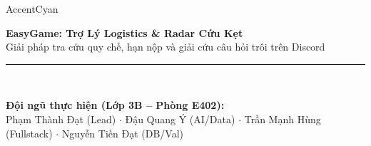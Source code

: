 \documentclass[aspectratio=169,10pt]{beamer}
\begin{document}
\begin{frame}[plain]
  \vfill
  \centering
  \begin{glassbox}[width=0.92\textwidth]{AccentCyan}
    \centering
    \vspace{0.3cm}
    \vspace{0.4cm}
    
    {\Huge \textbf{\color{TextLight}EasyGame: Trợ Lý Logistics \& Radar Cứu Kẹt}}\\[0.2cm]
    {\large \color{AccentCyan} Giải pháp tra cứu quy chế, hạn nộp và giải cứu câu hỏi trôi trên Discord}\\[0.4cm]
    
    \textcolor{BorderCol}{\rule{0.8\textwidth}{0.5pt}}\\[0.3cm]
    
    \begin{minipage}[t]{0.85\textwidth}
      \centering\small\color{TextMuted}
      \textbf{Đội ngũ thực hiện (Lớp 3B -- Phòng E402):}\\[0.1cm]
      Phạm Thành Đạt (Lead) $\cdot$ Đậu Quang Ý (AI/Data) $\cdot$ Trần Mạnh Hùng (Fullstack) $\cdot$ Nguyễn Tiến Đạt (DB/Val)
    \end{minipage}
    \vspace{0.3cm}
  \end{glassbox}
  \vfill
\end{frame}
\end{document}
